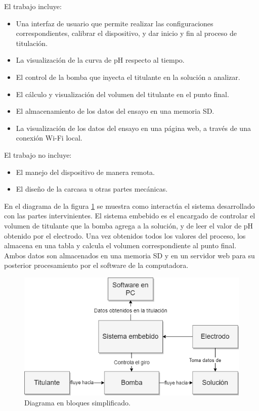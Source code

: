 El trabajo incluye:
\begin{itemize}
\item Una interfaz de usuario que permite realizar las configuraciones correspondientes, calibrar el dispositivo, y dar inicio y fin al proceso de titulación.
\item La visualización de la curva de pH respecto al tiempo.
\item El control de la bomba que inyecta el titulante en la solución a analizar.
\item El cálculo y visualización del volumen del titulante en el punto final.
\item El almacenamiento de los datos del ensayo en una memoria SD.
\item La visualización de los datos del ensayo en una página web, a través de una conexión Wi-Fi local.
\end{itemize}

\vspace{1.5cm}

El trabajo no incluye:
\begin{itemize}
\item El manejo del dispositivo de manera remota.
\item El diseño de la carcasa u otras partes mecánicas. 
\end{itemize}

En el diagrama de la figura \ref{fig:diagramaBloqueSimple} se muestra como interactúa el sistema desarrollado con las partes intervinientes. El sistema embebido es el encargado de controlar el volumen de titulante que la bomba agrega a la solución, y de leer el valor de pH obtenido por el electrodo. Una vez obtenidos todos los valores del proceso, los almacena en una tabla y calcula el volumen correspondiente al punto final. Ambos datos son almacenados en una memoria SD y en un servidor web para su posterior procesamiento por el software de la computadora.

\begin{figure}[htbp]
	\centering
	\includegraphics[width=.8\textwidth]{./Figures/DiagramaBloquesSimple.png}
	\caption{Diagrama en bloques simplificado.}
	\label{fig:diagramaBloqueSimple}
\end{figure}
